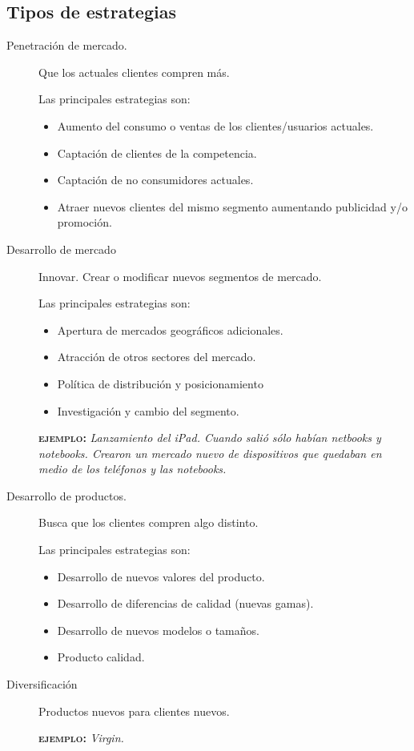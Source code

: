 \documentclass[12pt, spanish, a5paper]{article}
\begin{document}
\subsection{Tipos de estrategias \cite{ansoff}}



\begin{description}
	\item[Penetración de mercado.] Que los actuales clientes compren más.
	
	Las principales estrategias son:
	\begin{itemize}
	\item Aumento del consumo o ventas de los clientes/usuarios actuales.
	\item Captación de clientes de la competencia.
	\item Captación de no consumidores actuales.
	\item Atraer nuevos clientes del mismo segmento aumentando publicidad y/o promoción.
	\end{itemize}
	
	\item[Desarrollo de mercado] Innovar. Crear o modificar nuevos segmentos de mercado.
	
	Las principales estrategias son:
	\begin{itemize}
	\item Apertura de mercados geográficos adicionales.
	\item Atracción de otros sectores del mercado.
	\item Política de distribución y posicionamiento
	\item Investigación y cambio del segmento.
	\end{itemize}
	
	\textsc{\textbf{ejemplo:}}\textit{ Lanzamiento del iPad. Cuando salió sólo habían netbooks y notebooks. Crearon un mercado nuevo de dispositivos que quedaban en medio de los teléfonos y las notebooks.}
	
	\item[Desarrollo de productos.] Busca que los clientes compren algo distinto.

Las principales estrategias son:
\begin{itemize}
	\item Desarrollo de nuevos valores del producto.
	\item Desarrollo de diferencias de calidad (nuevas gamas).
	\item Desarrollo de nuevos modelos o tamaños.
	\item Producto calidad.
\end{itemize}

\item[Diversificación] Productos nuevos para clientes nuevos.

	\textsc{\textbf{ejemplo:}}\textit{ Virgin.}
\end{description}
\end{document}
